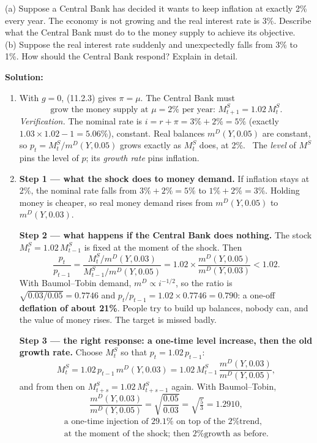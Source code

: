 \documentclass[12pt, letterpaper]{article}
\newcommand{\mD}{m^{D}}
\newcommand{\Ms}{M^{S}}
\begin{document}
\begin{tcolorbox}[oddbox,title={Problem 11.5 \quad Inflation Targeting}]
\begin{tcolorbox}[questionbox]
(a) Suppose a Central Bank has decided it wants to keep inflation at exactly 2\% every year. The
economy is not growing and the real interest rate is 3\%. Describe what the Central Bank must do
to the money supply to achieve its objective.\\
(b) Suppose the real interest rate suddenly and unexpectedly falls from 3\% to 1\%. How should
the Central Bank respond? Explain in detail.
\end{tcolorbox}

\textbf{Solution:}

\begin{enumerate}
\item With $g=0$, (11.2.3) gives $\pi=\mu$. The Central Bank must
\[
\boxed{\text{grow the money supply at }\mu=2\%\text{ per year: }\Ms_{t+1}=1.02\,\Ms_t.}
\]
\emph{Verification.} The nominal rate is $i=r+\pi=3\%+2\%=5\%$ (exactly
$1.03\times1.02-1=5.06\%$), constant. Real balances $\mD(Y,0.05)$ are constant, so
$p_t=\Ms_t/\mD(Y,0.05)$ grows exactly as $\Ms_t$ does, at 2\%. \checkmark\ The \emph{level}
of $\Ms$ pins the level of $p$; its \emph{growth rate} pins inflation.

\item \textbf{Step 1 --- what the shock does to money demand.} If inflation stays at 2\%, the
nominal rate falls from $3\%+2\%=5\%$ to $1\%+2\%=3\%$. Holding money is cheaper, so real money
demand rises from $\mD(Y,0.05)$ to $\mD(Y,0.03)$.

\textbf{Step 2 --- what happens if the Central Bank does nothing.} The stock $\Ms_t=1.02\,\Ms_{t-1}$
is fixed at the moment of the shock. Then
\[
\frac{p_t}{p_{t-1}}=\frac{\Ms_t/\mD(Y,0.03)}{\Ms_{t-1}/\mD(Y,0.05)}
=1.02\times\frac{\mD(Y,0.05)}{\mD(Y,0.03)}<1.02 .
\]
With Baumol--Tobin demand, $\mD\propto i^{-1/2}$, so the ratio is $\sqrt{0.03/0.05}=0.7746$ and
$p_t/p_{t-1}=1.02\times0.7746=0.790$: a one-off \textbf{deflation of about 21\%}. People try to
build up balances, nobody can, and the value of money rises. The target is missed badly.

\textbf{Step 3 --- the right response: a one-time level increase, then the old growth rate.}
Choose $\Ms_t$ so that $p_t=1.02\,p_{t-1}$:
\[
\Ms_t=1.02\,p_{t-1}\,\mD(Y,0.03)=1.02\,\Ms_{t-1}\,\frac{\mD(Y,0.03)}{\mD(Y,0.05)},
\]
and from then on $\Ms_{t+s}=1.02\,\Ms_{t+s-1}$ again. With Baumol--Tobin,
\[
\frac{\mD(Y,0.03)}{\mD(Y,0.05)}=\sqrt{\frac{0.05}{0.03}}=\sqrt{\tfrac53}=1.2910,
\]
\[
\boxed{\begin{array}{c}\text{a one-time injection of }29.1\%\text{ on top of the 2\% trend,}\\
\text{at the moment of the shock; then 2\% growth as before.}\end{array}}
\]


\end{enumerate}
\end{tcolorbox}
\end{document}

